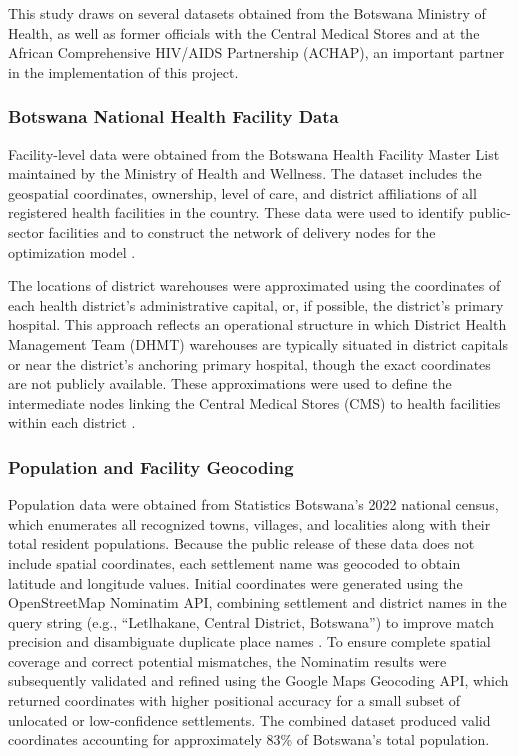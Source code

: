 \documentclass{article}
\begin{document}
This study draws on several datasets obtained from the Botswana Ministry of Health, as well as former officials with the Central Medical Stores and at the African Comprehensive HIV/AIDS Partnership (ACHAP), an important partner in the implementation of this project.

\subsubsection{Botswana National Health Facility Data}

Facility-level data were obtained from the Botswana Health Facility Master List maintained by the Ministry of Health and Wellness. The dataset includes the geospatial coordinates, ownership, level of care, and district affiliations of all registered health facilities in the country. These data were used to identify public-sector facilities and to construct the network of delivery nodes for the optimization model \cite{mohw_facilitylist}.

The locations of district warehouses were approximated using the coordinates of each health district’s administrative capital, or, if possible, the district's primary hospital. This approach reflects an operational structure in which District Health Management Team (DHMT) warehouses are typically situated in district capitals or near the district's anchoring primary hospital, though the exact coordinates are not publicly available. These approximations were used to define the intermediate nodes linking the Central Medical Stores (CMS) to health facilities within each district \cite{mapiki2025}.

\subsubsection{Population and Facility Geocoding}
\label{popfacgeocoding}

Population data were obtained from Statistics Botswana's 2022 national census, which enumerates all recognized towns, villages, and localities along with their total resident populations. Because the public release of these data does not include spatial coordinates, each settlement name was geocoded to obtain latitude and longitude values. Initial coordinates were generated using the OpenStreetMap Nominatim API, combining settlement and district names in the query string (e.g., ``Letlhakane, Central 
District, Botswana'') to improve match precision and disambiguate duplicate place names \cite{nominatim}. To ensure complete spatial coverage and correct potential mismatches, the Nominatim results were subsequently validated and refined using the Google Maps Geocoding API, which returned coordinates with higher positional accuracy for a small subset of unlocated or low-confidence settlements. The combined dataset produced valid coordinates accounting for approximately 83\% of Botswana's total population.
\end{document}
